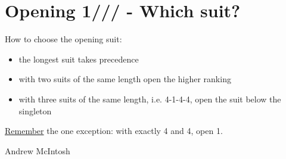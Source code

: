 \documentclass[14pt]{extarticle}
\begin{document}
\newpage
\vspace*{\fill}
\begingroup
\centering
\section*{Opening 1\textcolor{ForestGreen}{}/\textcolor{orange}{}/\textcolor{red}{}/\textcolor{blue}{} - Which suit?}
\endgroup

\noindent How to choose the opening suit:\\
\begin{itemize}
\item the longest suit takes precedence
\item with two suits of the same length open the higher ranking \item with three suits of the same length, i.e. 4-1-4-4, open the suit below the singleton
\end{itemize}

\noindent \smallpencil \underline{Remember} the one exception: with exactly 4\textcolor{red}{} and 4\textcolor{blue}{}, open 1\textcolor{red}{}.

\vspace*{\fill}
\begin{flushbottom}
 \begin{center}
 \tiny
 \textcopyright Andrew McIntosh
\end{center}
\end{flushbottom}
\end{document}
